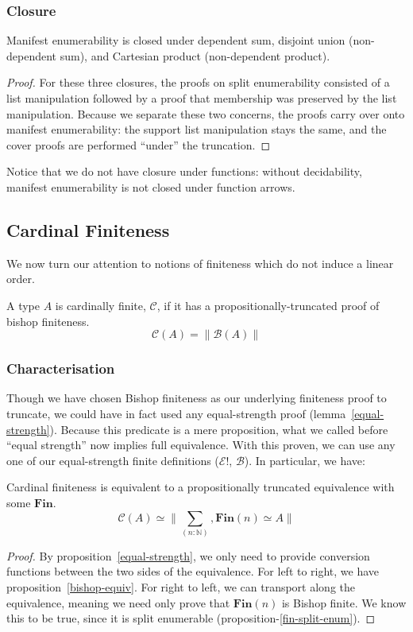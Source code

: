 \begin{refsection}
\subsubsection{Closure}
\begin{lemma}
  Manifest enumerability is closed under dependent sum, disjoint union
  (non-dependent sum), and Cartesian product (non-dependent product).
\end{lemma}
\begin{proof}
  For these three closures, the proofs on split enumerability consisted of a
  list manipulation followed by a proof that membership was preserved by the
  list manipulation.
  Because we separate these two concerns, the proofs carry over onto manifest
  enumerability: the support list manipulation stays the same, and the
  cover proofs are performed ``under'' the truncation.
\end{proof}
Notice that we do not have closure under functions: without decidability,
manifest enumerability is not closed under function arrows.
\subsection{Cardinal Finiteness} \label{cardinal}
We now turn our attention to notions of finiteness which do not induce a linear
order.
\begin{definition}
  A type \(A\) is cardinally finite, \(\mathcal{C}\), if it has a
  propositionally-truncated proof of bishop finiteness.
  \begin{equation}
    \mathcal{C}(A) = \lVert \mathcal{B}(A) \rVert
  \end{equation}
\end{definition}
\subsubsection{Characterisation}
Though we have chosen Bishop finiteness as our underlying finiteness proof to
truncate, we could have in fact used any equal-strength proof
(lemma~\ref{equal-strength}).
Because this predicate is a mere proposition, what we called before ``equal
strength'' now implies full equivalence.
With this proven, we can use any one of our equal-strength finite definitions
(\(\mathcal{E}!\), \(\mathcal{B}\)).
In particular, we have:
\begin{lemma}
  Cardinal finiteness is equivalent to a propositionally truncated equivalence
  with some \(\textbf{Fin}\).
  \begin{equation}
    \mathcal{C}(A) \simeq \lVert \sum_{(n : \mathbb{N})} , \textbf{Fin}(n) \simeq A \rVert
  \end{equation}
\end{lemma}
\begin{proof}
  By proposition~\ref{equal-strength}, we only need to provide conversion
  functions between the two sides of the equivalence.
  For left to right, we have proposition~\ref{bishop-equiv}.
  For right to left, we can transport along the equivalence, meaning we need
  only prove that \(\textbf{Fin}(n)\) is Bishop finite.
  We know this to be true, since it is split enumerable
  (proposition-\ref{fin-split-enum}).
\end{proof}

\end{refsection}
